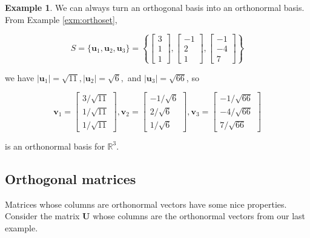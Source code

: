 \documentclass[
]{book}
\theoremstyle{definition}
\theoremstyle{definition}
\newtheorem{example}{Example}[chapter]
\theoremstyle{definition}
\theoremstyle{definition}
\theoremstyle{remark}
\begin{document}
\begin{examplebox}

\begin{example}
We can always turn an orthogonal basis into an orthonormal basis. From Example \ref{exm:orthoset},

\[S=\{\mathbf{u}_1,\mathbf{u}_2,\mathbf{u}_3\}=\left\{\begin{bmatrix}3\\1\\1\end{bmatrix},\begin{bmatrix}-1\\2\\1\end{bmatrix},\begin{bmatrix}-1\\-4\\7\end{bmatrix}\right\}\]

we have \(|\mathbf{u}_1|=\sqrt{11},|\mathbf{u}_2|=\sqrt{6},\) and \(|\mathbf{u}_3|=\sqrt{66}\), so

\[\mathbf{v}_1=\begin{bmatrix}3/\sqrt{11}\\1/\sqrt{11}\\1/\sqrt{11}\end{bmatrix},\mathbf{v}_2=\begin{bmatrix}-1/\sqrt{6}\\2/\sqrt{6}\\1/\sqrt{6}\end{bmatrix},\mathbf{v}_3=\begin{bmatrix}-1/\sqrt{66}\\-4/\sqrt{66}\\7/\sqrt{66}\end{bmatrix}\]

is an orthonormal basis for \(\mathbb{R}^3\).
\end{example}

\end{examplebox}

\subsection*{Orthogonal matrices}\label{orthogonal-matrices}

Matrices whose columns are orthonormal vectors have some nice properties. Consider the matrix \(\mathbf{U}\) whose columns are the orthonormal vectors from our last example.
\end{document}
